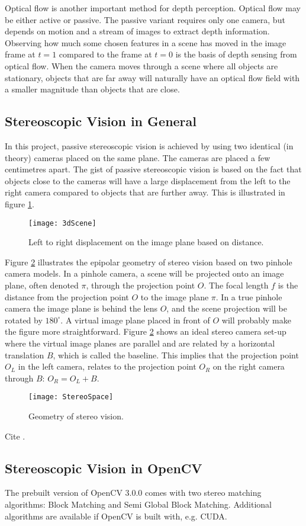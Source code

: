 Optical flow is another important method for depth perception. Optical flow may be either active or passive. The passive variant requires  only one camera, but depends on motion and a stream of images to extract depth information. Observing how much some chosen features in a scene has moved in the image frame at $t = 1$ compared to the frame at $t = 0$ is the basis of depth sensing from optical flow. When the camera moves through a scene where all objects are stationary, objects that are far away will naturally have an optical flow field with a smaller magnitude than objects that are close. 

\subsection{Stereoscopic Vision in General}

In this project, passive stereoscopic vision is achieved by using two identical (in theory) cameras placed on the same plane. The cameras are placed a few centimetres apart. The gist of passive stereoscopic vision is based on the fact that objects close to the cameras will have a large displacement from the left to the right camera compared to objects that are further away. This is illustrated in figure \ref{fig:3dScene}.

\begin{figure}
\centering
\texttt{[image: 3dScene]}
\caption{\label{fig:3dScene}Left to right displacement on the image plane based on distance.}
\end{figure} 

Figure \ref{fig:StereoSpace} illustrates the epipolar geometry of stereo vision based on two pinhole camera models. In a pinhole camera, a scene will be projected onto an image plane, often denoted $\pi$, through the projection point $O$. The focal length $f$ is the distance from the projection point $O$ to the image plane $\pi$. In a true pinhole camera the image plane is behind the lens $O$, and the scene projection will be rotated by $180^{\circ}$. A virtual image plane placed in front of $O$ will probably make the figure more straightforward. Figure \ref{fig:StereoSpace} shows an ideal stereo camera set-up where the virtual image planes are parallel and are related by a horizontal translation $B$, which is called the baseline. This implies that the projection point $O_L$  in the left camera, relates to the projection point $O_R$ on the right camera through $B$: $O_R = O_L + B$.



\begin{figure}
\centering
\texttt{[image: StereoSpace]}
\caption{\label{fig:StereoSpace}Geometry of stereo vision.}
\end{figure}

Cite \cite{einstein}.

\subsection{Stereoscopic Vision in OpenCV}

The prebuilt version of OpenCV 3.0.0 comes with two stereo matching algorithms: Block Matching and Semi Global Block Matching. Additional algorithms are available if OpenCV is built with, e.g. CUDA.